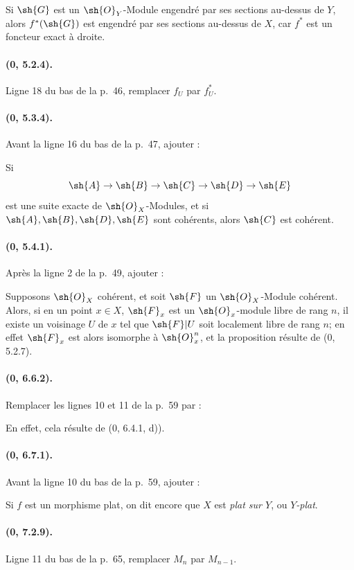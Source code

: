 Si $\sh{G}$ est un $\sh{O}_Y$-Module engendré par ses sections au-dessus
de $Y$, alors $f^*(\sh{G})$ est engendré par ses sections au-dessus de
$X$, car $f^*$ est un foncteur exact à droite.

\paragraph{(0, 5.2.4).}
Ligne 18 du bas de la p.~46, remplacer $f_U$ par $f_U^*$.

\paragraph{(0, 5.3.4).}
Avant la ligne 16 du bas de la p.~47, ajouter :

Si
\[
  \sh{A}\to\sh{B}\to\sh{C}\to\sh{D}\to\sh{E}
\]
est une suite exacte de $\sh{O}_X$-Modules, et si
$\sh{A},\sh{B},\sh{D},\sh{E}$ sont cohérents, alors $\sh{C}$ est
cohérent.

\paragraph{(0, 5.4.1).}
Après la ligne 2 de la p.~49, ajouter :

Supposons $\sh{O}_X$ cohérent, et soit $\sh{F}$ un $\sh{O}_X$-Module
cohérent. Alors, si en un point $x\in X$, $\sh{F}_x$ est un
$\sh{O}_x$-module libre de rang $n$, il existe un voisinage $U$ de $x$
tel que $\sh{F}|U$ soit localement libre de rang $n$; en effet
$\sh{F}_x$ est alors isomorphe à $\sh{O}_x^n$, et la proposition résulte
de (0, 5.2.7).

\paragraph{(0, 6.6.2).}
Remplacer les lignes 10 et 11 de la p.~59 par :

En effet, cela résulte de (0, 6.4.1, d)).

\paragraph{(0, 6.7.1).}
Avant la ligne 10 du bas de la p.~59, ajouter :

Si $f$ est un morphisme plat, on dit encore que $X$ est \emph{plat sur
$Y$}, ou \emph{$Y$-plat}.

\paragraph{(0, 7.2.9).}
Ligne 11 du bas de la p.~65, remplacer $M_n$ par $M_{n-1}$.

